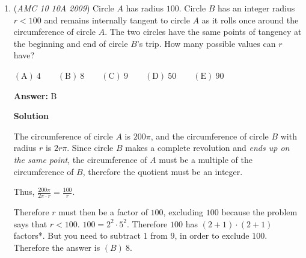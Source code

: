 \begin{enumerate}
 Thus, $60-24=36$ children only play soccer.

 So our numerator is $36$.

 Our denominator is simply $100-\text{Swimmers}=100-30=70$

 And so we get $\frac{36}{70}$ which is roughly $51.4\% \Rightarrow \boxed{\text{D}}$




\textbf{Solution 3}

WLOG, let the total number of students be $100$. Draw a venn diagram with 2 circles encompassing these 4 regions: 

 
Non-soccer players, non-swimmers: 34 people

 Soccer players, non-swimmers: 36 people

 Soccer players, swimmers: 24 people

 Non-soccer players, swimmers: 6 people. 

 
Hence the answer is $\frac{36}{70}=\frac{18}{35}$. We know this is a little bit larger than $\frac 12$ because $\frac{17.5}{35}=\frac 12$. $\boxed{\textbf{(D) } 51\%}$



	\item (\textit{AMC 10 10A 2009}) Circle $A$ has radius $100$. Circle $B$ has an integer radius $r<100$ and remains internally tangent to circle $A$ as it rolls once around the circumference of circle $A$. The two circles have the same points of tangency at the beginning and end of circle $B$'s trip. How many possible values can $r$ have?


 $\mathrm{(A)}\ 4 \qquad \mathrm{(B)}\ 8 \qquad \mathrm{(C)}\ 9 \qquad \mathrm{(D)}\ 50 \qquad \mathrm{(E)}\ 90$

 \textbf{Answer: }B



\textbf{Solution}

The circumference of circle $A$ is $200\pi$, and the circumference of circle $B$ with radius $r$ is $2r\pi$. Since circle $B$ makes a complete revolution and \textit{ends up on the same point}, the circumference of $A$ must be a multiple of the circumference of $B$, therefore the quotient must be an integer.

 Thus, $\frac{200\pi}{2\pi \cdot r} = \frac{100}{r}$.

 Therefore $r$ must then be a factor of $100$, excluding $100$ because the problem says that $r<100$. $100 = 2^2 \cdot  5^2$. Therefore $100$ has $(2+1) \cdot (2+1)$ factors*. But you need to subtract $1$ from $9$, in order to exclude $100$. Therefore the answer is $\boxed{(B)\ 8}$.


\end{enumerate}
